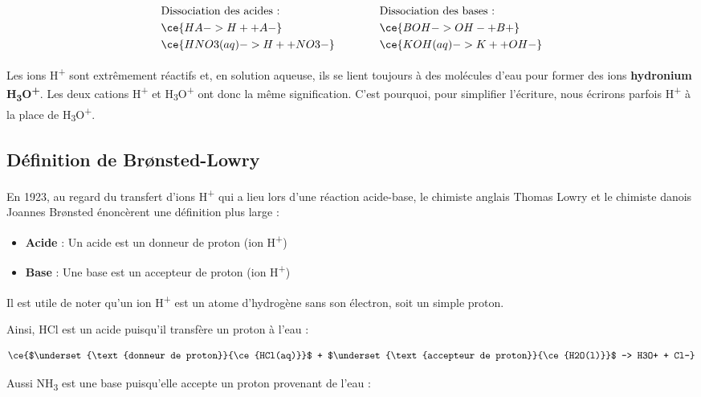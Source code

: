 \documentclass[
  11pt,
  a4paper,
  openany]{book}
\providecommand{\tightlist}{%
  \setlength{\itemsep}{0pt}\setlength{\parskip}{0pt}}
\begin{document}
\[
\begin{split}
& \text{Dissociation des acides :} \\
& \ce{HA -> H+ + A-} \\
& \ce{HNO3(aq) -> H+ + NO3-}
\end{split}
\qquad\qquad
\begin{split}
& \text{Dissociation des bases :} \\
& \ce{BOH -> OH- + B+} \\
& \ce{KOH(aq) -> K+ + OH-}
\end{split}
\]

Les ions H\textsuperscript{+} sont extrêmement réactifs et, en solution aqueuse, ils se lient toujours à des molécules d'eau pour former des ions \textbf{hydronium H\textsubscript{3}O\textsuperscript{+}}. Les deux cations H\textsuperscript{+} et H\textsubscript{3}O\textsuperscript{+} ont donc la même signification. C'est pourquoi, pour simplifier l'écriture, nous écrirons parfois H\textsuperscript{+} à la place de H\textsubscript{3}O\textsuperscript{+}.

\clearpage

\subsection{Définition de Brønsted-Lowry}\label{duxe9finition-de-bruxf8nsted-lowry}

En 1923, au regard du transfert d'ions H\textsuperscript{+} qui a lieu lors d'une réaction acide-base, le chimiste anglais Thomas Lowry et le chimiste danois Joannes Brønsted énoncèrent une définition plus large :

\begin{itemize}
\tightlist
\item
  \textbf{Acide} : Un acide est un donneur de proton (ion H\textsuperscript{+})
\item
  \textbf{Base} : Une base est un accepteur de proton (ion H\textsuperscript{+})
\end{itemize}

Il est utile de noter qu'un ion H\textsuperscript{+} est un atome d'hydrogène sans son électron, soit un simple proton.

Ainsi, HCl est un acide puisqu'il transfère un proton à l'eau :

\[
\ce{$\underset{\text{donneur de proton}}{\ce{HCl(aq)}}$ + $\underset{\text{accepteur de proton}}{\ce{H2O(l)}}$ -> H3O+ + Cl-}
\]

Aussi NH\textsubscript{3} est une base puisqu'elle accepte un proton provenant de l'eau :
\end{document}
